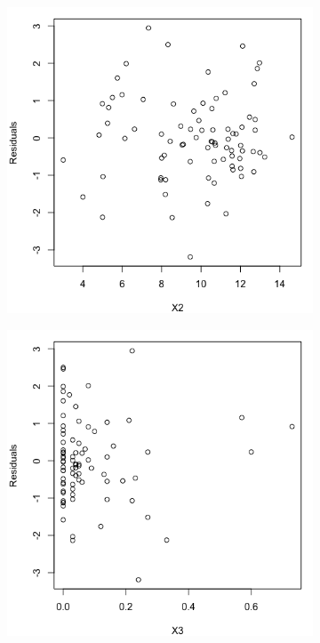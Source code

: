 \documentclass[10pt]{report}
\begin{document}
\begin{enumerate}
\begin{figure}[H]
\begin{subfigure}[b]{.25\linewidth}
		\end{subfigure}%
		\begin{subfigure}[b]{.25\linewidth}
			\includegraphics[width=\linewidth]{p2/18e_x2.png} 
		\end{subfigure}%
		\begin{subfigure}[b]{.25\linewidth}
			\includegraphics[width=\linewidth]{p2/18e_x3.png} 

\end{subfigure}
\end{figure}
\end{enumerate}
\end{document}
